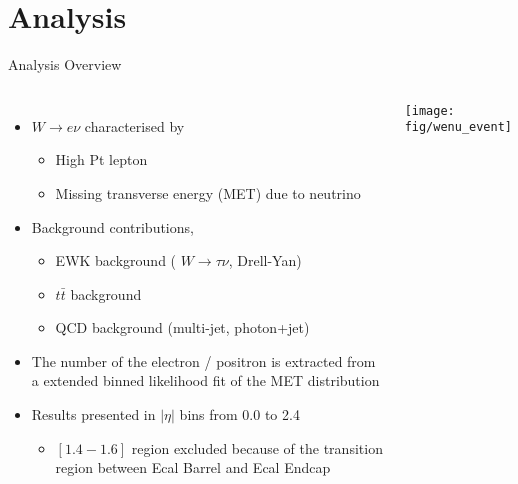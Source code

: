 \documentclass[8pt]{beamer}
\begin{document}
\section{Analysis}

\begin{frame}{Analysis Overview}
  \begin{columns}[c]
  \begin{itemize}
    \item $W \to e\nu$ characterised by 
    \begin{itemize}
      \item High Pt lepton 
      \item Missing transverse energy (MET) due to neutrino
    \end{itemize}
    \item Background contributions,
    \begin{itemize}
      \item EWK background ( $W \to \tau\nu$, Drell-Yan)
      \item $t\bar{t}$ background
      \item QCD background (multi-jet, photon+jet)
    \end{itemize}
    \item The number of the electron / positron is extracted from a extended binned likelihood fit of the MET distribution
    \item Results presented in $|\eta|$ bins from 0.0 to 2.4
    \begin{itemize}
      \item $[1.4-1.6]$ region excluded because of the transition region between Ecal Barrel and Ecal Endcap
    \end{itemize}
  \end{itemize}
    \texttt{[image: fig/wenu\_event]}
  \end{columns}
\end{frame}
\end{document}
